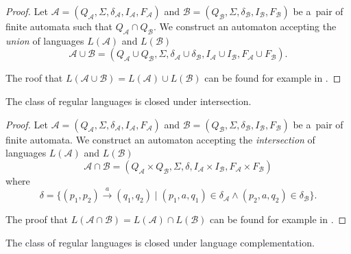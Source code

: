 \begin{proof}
Let $\mathcal{A} = (Q_\mathcal{A}, \Sigma, \delta_\mathcal{A}, I_\mathcal{A},
F_\mathcal{A})$ and $\mathcal{B} = (Q_\mathcal{B}, \Sigma, \delta_\mathcal{B},
I_\mathcal{B}, F_\mathcal{B})$ be a~pair of finite automata such that
$Q_\mathcal{A} \cap Q_\mathcal{B}$. We construct an automaton accepting the
\emph{union} of languages $L(\mathcal{A})$ and $L(\mathcal{B})$  
 \begin{equation} \mathcal{A} \cup \mathcal{B} = (Q_\mathcal{A} \cup
 Q_\mathcal{B}, \Sigma, \delta_\mathcal{A} \cup \delta_\mathcal{B},
 I_\mathcal{A} \cup I_\mathcal{B}, F_\mathcal{A} \cup
F_\mathcal{B}).
\end{equation}
	
The roof that $L(\mathcal{A} \cup \mathcal{B}) = L(\mathcal{A}) \cup
L(\mathcal{B})$ can be found for example in \cite{tin}.
\end{proof}

  \begin{theorem}
	 The class of regular languages is closed under intersection.
	\end{theorem}
	
	\begin{proof}
Let $\mathcal{A} = (Q_\mathcal{A}, \Sigma, \delta_\mathcal{A}, I_\mathcal{A},
F_\mathcal{A})$ and $\mathcal{B} = (Q_\mathcal{B}, \Sigma, \delta_\mathcal{B},
I_\mathcal{B}, F_\mathcal{B})$ be a~pair of finite automata. We construct an
automaton accepting the \emph{intersection} of languages $L(\mathcal{A})$ and
$L(\mathcal{B})$ 
\begin{equation}
\mathcal{A} \cap \mathcal{B} = (Q_\mathcal{A} \times
Q_\mathcal{B}, \Sigma, \delta, I_\mathcal{A} \times I_\mathcal{B}, F_\mathcal{A}
\times F_\mathcal{B})
\end{equation} where 
\begin{equation}
\delta = \{(p_1, p_2)
\overset{a}{\longrightarrow} (q_1, q_2) \mid (p_1, a, q_1) \in \delta_\mathcal{A}
\wedge (p_2, a, q_2) \in \delta_\mathcal{B}\}.
\end{equation}
	
The proof that $L(\mathcal{A} \cap \mathcal{B}) = L(\mathcal{A}) \cap
L(\mathcal{B})$ can be found for example in \cite{tin}.
\end{proof}
	
 \begin{theorem}
  The class of regular languages is closed under language complementation.
\end{theorem}
	
